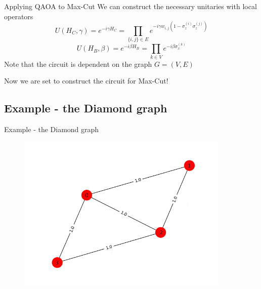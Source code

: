 \documentclass{beamer}
\begin{document}
{\begin{frame}{Applying QAOA to Max-Cut}
We can construct the necessary unitaries with local operators
\begin{equation}
	U(H_C, \gamma) = e^{-i\gamma H_C} = \prod_{\{i,j\}\in E} e^{-i\gamma w_{i,j}(1 - \sigma_z^{(i)}\sigma_z^{(j)})}
\end{equation} 
\begin{equation}
	U(H_B,\beta) = e^{-i\beta H_B} = \prod_{k\in V} e^{-i\beta\sigma_x^{(k)}}
\end{equation}
Note that the circuit is dependent on the graph $G = (V,E)$

\vspace{1cm}
Now we are set to construct the circuit for Max-Cut!
\end{frame}

\subsection{Example - the Diamond graph}
\begin{frame}{Example - the Diamond graph}
\begin{figure}
	\centering
	\includegraphics[width=0.9\textwidth]{figures/diamond-graph}
\end{figure}
\end{frame}

}
\end{document}
